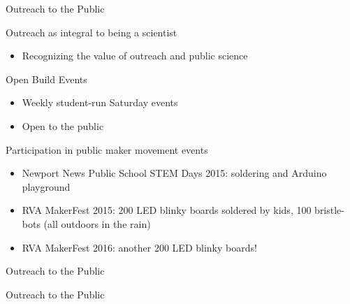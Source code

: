 \documentclass[xcolor=table,compress,professionalfonts,pdfpagelabels]{beamer}
\begin{document}
\begin{frame}{Outreach to the Public}
 \begin{block}{Outreach as integral to being a scientist}
  \begin{itemize}
   \item Recognizing the value of outreach and public science
  \end{itemize}
 \end{block}
 \begin{block}{Open Build Events}
  \begin{itemize}
   \item Weekly student-run Saturday events
   \item Open to the public
  \end{itemize}
 \end{block}
 \begin{block}{Participation in public maker movement events}
  \begin{itemize}
   \item Newport News Public School STEM Days 2015: soldering and Arduino playground
   \item RVA MakerFest 2015: 200 LED blinky boards soldered by kids, 100 bristle-bots (all outdoors in the rain)
   \item RVA MakerFest 2016: another 200 LED blinky boards!
  \end{itemize}
 \end{block}
\end{frame}

\begin{frame}{Outreach to the Public}
\end{frame}

\begin{frame}{Outreach to the Public}
\end{frame}
\end{document}
